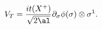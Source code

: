 \begin{equation}
 V_T =
 \frac{i t (X^+)}{\sqrt{2 \al}} \partial_{\sigma} \phi (\sigma) 
   \otimes \sigma^1 .
\label{tachyon}
\end{equation}

